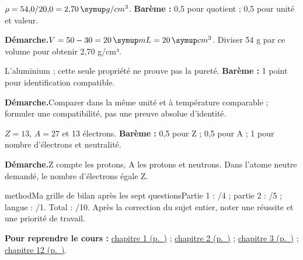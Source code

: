 \label{cor-bb-7}
\par\noindent\begin{minipage}{\linewidth}
$\rho=54{,}0/20{,}0=2{,}70\unite{g/cm^3}$. \textbf{Barème :} 0,5 pour quotient ; 0,5 pour unité et valeur.\par
\smallskip\noindent\textbf{Démarche.}\enspace $V=50-30=20\unite{mL}=20\unite{cm^3}$. Diviser 54 g par ce volume pour obtenir 2,70 g/cm³.\par
{}
\end{minipage}\par
\par\noindent\begin{minipage}{\linewidth}
L’aluminium ; cette seule propriété ne prouve pas la pureté. \textbf{Barème :} 1 point pour identification compatible.\par
\smallskip\noindent\textbf{Démarche.}\enspace Comparer dans la même unité et à température comparable ; formuler une compatibilité, pas une preuve absolue d’identité.\par
\end{minipage}\par
\par\noindent\begin{minipage}{\linewidth}
$Z=13$, $A=27$ et 13 électrons. \textbf{Barème :} 0,5 pour Z ; 0,5 pour A ; 1 pour nombre d’électrons et neutralité.\par
\smallskip\noindent\textbf{Démarche.}\enspace Z compte les protons, A les protons et neutrons. Dans l’atome neutre demandé, le nombre d’électrons égale Z.\par
{}
\end{minipage}\par
\par\noindent\begin{minipage}{\linewidth}
\begin{pcEncadre}{method}{Ma grille de bilan après les sept questions}Partie 1 : /4 ; partie 2 : /5 ; langue : /1. Total : /10. Après la correction du sujet entier, noter une réussite et une priorité de travail.\end{pcEncadre}
{\small\textbf{Pour reprendre le cours : }\hyperref[chap-1]{chapitre 1 (p.~\pageref*{chap-1})} ; \hyperref[chap-2]{chapitre 2 (p.~\pageref*{chap-2})} ; \hyperref[chap-3]{chapitre 3 (p.~\pageref*{chap-3})} ; \hyperref[chap-12]{chapitre 12 (p.~\pageref*{chap-12})}.\par}\end{minipage}\par
